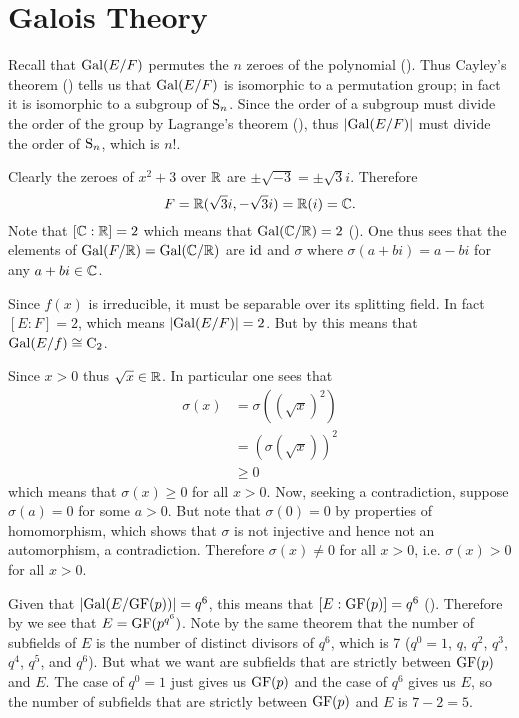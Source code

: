 \section{Galois Theory}
\begin{questions}
    \item Recall that $\mathrm{Gal}(E/F)$ permutes the $n$ zeroes of the polynomial (). Thus Cayley's theorem () tells us that $\mathrm{Gal}(E/F)$ is isomorphic to a permutation group; in fact it is isomorphic to a subgroup of $\mathrm{S}_{n}$. Since the order of a subgroup must divide the order of the group by Lagrange's theorem (), thus $|\mathrm{Gal}(E/F)|$ must divide the order of $\mathrm{S}_{n}$, which is $n!$.
    
    \item Clearly the zeroes of $x^2 + 3$ over $\mathbb{R}$ are $\pm\sqrt{-3} = \pm\sqrt3i$. Therefore
    \[
        F = \mathbb{R}(\sqrt3i, -\sqrt3i) = \mathbb{R}(i) = \mathbb{C}.
    \]
    Note that $[\mathbb{C}:\mathbb{R}] = 2$ which means that $\mathrm{Gal}(\mathbb{C}/\mathbb{R}) = 2$ (). One thus sees that the elements of $\mathrm{Gal}(F/\mathbb{R}) = \mathrm{Gal}(\mathbb{C}/\mathbb{R})$ are $\mathrm{id}$ and $\sigma$ where $\sigma(a + bi) = a - bi$ for any $a + bi \in \mathbb{C}$.

    \item Since $f(x)$ is irreducible, it must be separable over its splitting field. In fact $[E:F] = 2$, which means $|\mathrm{Gal}(E/F)| = 2$. But by  this means that $\mathrm{Gal}(E/f) \cong \mathrm{C}_{2}$.
    
    \item Since $x > 0$ thus $\sqrt x \in \mathbb{R}$. In particular one sees that
    \begin{align*}
        \sigma(x) &= \sigma\left((\sqrt x)^2\right)\\
        &= \left(\sigma(\sqrt x)\right)^2\\
        &\geq 0
    \end{align*}
    which means that $\sigma(x) \geq 0$ for all $x > 0$. Now, seeking a contradiction, suppose $\sigma(a) = 0$ for some $a > 0$. But note that $\sigma(0) = 0$ by properties of homomorphism, which shows that $\sigma$ is not injective and hence not an automorphism, a contradiction. Therefore $\sigma(x) \neq 0$ for all $x > 0$, i.e. $\sigma(x) > 0$ for all $x > 0$.
    
    \item Given that $|\mathrm{Gal}(E/\mathrm{GF}(p))| = q^6$, this means that $[E:\mathrm{GF}(p)] = q^6$ (). Therefore by  we see that $E = \mathrm{GF}(p^{q^6})$. Note by the same theorem that the number of subfields of $E$ is the number of distinct divisors of $q^6$, which is 7 ($q^0 = 1$, $q$, $q^2$, $q^3$, $q^4$, $q^5$, and $q^6$). But what we want are subfields that are strictly between $\mathrm{GF}(p)$ and $E$. The case of $q^0 = 1$ just gives us $\mathrm{GF}(p)$ and the case of $q^6$ gives us $E$, so the number of subfields that are strictly between $\mathrm{GF}(p)$ and $E$ is $7 - 2 = 5$.
    

\end{questions}
